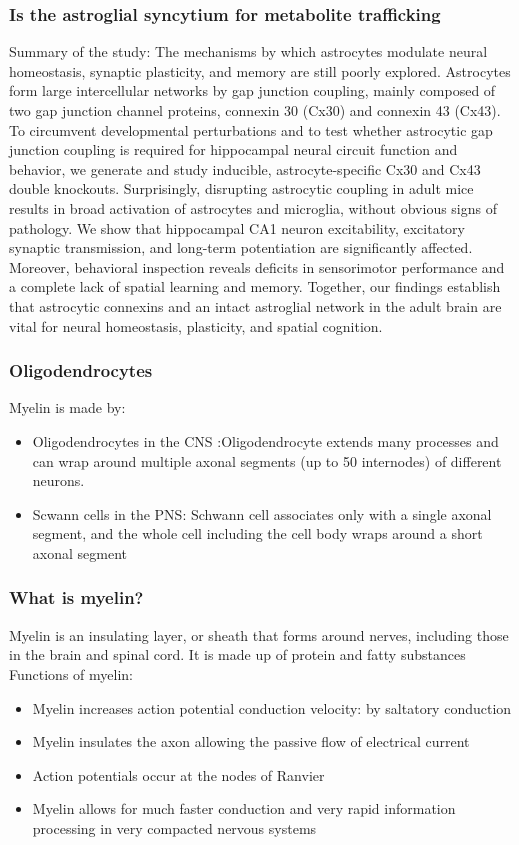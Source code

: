 \begin{itemize}
\begin{itemize}
\subsubsection{Is the astroglial syncytium for metabolite trafficking}
Summary of the study: The mechanisms by which astrocytes modulate neural homeostasis, synaptic plasticity, and memory are still poorly explored. Astrocytes form large intercellular networks by gap junction coupling, mainly composed of two gap junction channel proteins, connexin 30 (Cx30) and connexin 43 (Cx43). To circumvent developmental perturbations and to test whether astrocytic gap junction coupling is required for hippocampal neural circuit function and behavior, we generate and study inducible, astrocyte-specific Cx30 and Cx43 double knockouts. Surprisingly, disrupting astrocytic coupling in adult mice results in broad activation of astrocytes and microglia, without obvious signs of pathology. We show that hippocampal CA1 neuron excitability, excitatory synaptic transmission, and long-term potentiation are significantly affected. Moreover, behavioral inspection reveals deficits in sensorimotor performance and a complete lack of spatial learning and memory. Together, our findings establish that astrocytic connexins and an intact astroglial network in the adult brain are vital for neural homeostasis, plasticity, and spatial cognition.
\subsubsection{Oligodendrocytes}
Myelin is made by:
\begin{itemize}
    \item Oligodendrocytes in the CNS  :Oligodendrocyte extends many processes
and can wrap around multiple axonal
segments (up to 50 internodes)
of different neurons.
\item Scwann cells in the PNS: Schwann cell associates only with
a single axonal segment, and the whole cell
including the cell body wraps around
a short axonal segment
\end{itemize}

\subsubsection{What is myelin?}
Myelin is an insulating layer, or sheath that forms around nerves, including those in the brain and spinal cord. It is made up of protein and fatty substances
\\Functions of myelin:
\begin{itemize}
    \item Myelin increases action
potential conduction velocity:
by saltatory conduction
\item Myelin insulates the axon
allowing the passive flow of
electrical current
\item Action potentials occur at the
nodes of Ranvier
\item Myelin allows for much faster conduction and very rapid information processing in very compacted nervous systems
\end{itemize}

\end{itemize}
\end{itemize}
